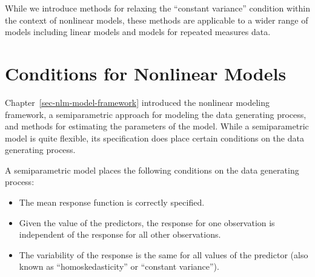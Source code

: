 \documentclass[
  letterpaper,
  DIV=11,
  numbers=noendperiod]{scrreprt}
\providecommand{\tightlist}{%
  \setlength{\itemsep}{0pt}\setlength{\parskip}{0pt}}\usepackage{longtable,booktabs,array}
\theoremstyle{definition}
\theoremstyle{definition}
\theoremstyle{remark}
\begin{document}
\begin{tcolorbox}[enhanced jigsaw, left=2mm, toprule=.15mm, arc=.35mm, breakable, opacitybacktitle=0.6, opacityback=0, rightrule=.15mm, colbacktitle=quarto-callout-note-color!10!white, coltitle=black, leftrule=.75mm, toptitle=1mm, colframe=quarto-callout-note-color-frame, titlerule=0mm, title=\textcolor{quarto-callout-note-color}{\faInfo}\hspace{0.5em}{Note}, bottomrule=.15mm, colback=white, bottomtitle=1mm]

While we introduce methods for relaxing the ``constant variance''
condition within the context of nonlinear models, these methods are
applicable to a wider range of models including linear models and models
for repeated measures data.

\end{tcolorbox}

\hypertarget{conditions-for-nonlinear-models}{%
\section{Conditions for Nonlinear
Models}\label{conditions-for-nonlinear-models}}

Chapter~\ref{sec-nlm-model-framework} introduced the nonlinear modeling
framework, a semiparametric approach for modeling the data generating
process, and methods for estimating the parameters of the model. While a
semiparametric model is quite flexible, its specification does place
certain conditions on the data generating process.

\begin{tcolorbox}[enhanced jigsaw, left=2mm, toprule=.15mm, arc=.35mm, breakable, opacitybacktitle=0.6, opacityback=0, rightrule=.15mm, colbacktitle=quarto-callout-note-color!10!white, coltitle=black, leftrule=.75mm, toptitle=1mm, colframe=quarto-callout-note-color-frame, titlerule=0mm, title=\textcolor{quarto-callout-note-color}{\faInfo}\hspace{0.5em}{Conditions for the Semiparametric Nonlinear Model}, bottomrule=.15mm, colback=white, bottomtitle=1mm]

A semiparametric model places the following conditions on the data
generating process:

\begin{itemize}
\tightlist
\item
  The mean response function is correctly specified.
\item
  Given the value of the predictors, the response for one observation is
  independent of the response for all other observations.
\item
  The variability of the response is the same for all values of the
  predictor (also known as ``homoskedasticity'' or ``constant
  variance'').
\end{itemize}

\end{tcolorbox}
\end{document}
